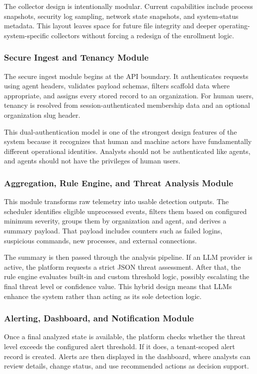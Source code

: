 \documentclass[12pt,a4paper]{article}
\begin{document}
The collector design is intentionally modular. Current capabilities include process snapshots, security log sampling, network state snapshots, and system-status metadata. This layout leaves space for future file integrity and deeper operating-system-specific collectors without forcing a redesign of the enrollment logic.

\subsubsection{Secure Ingest and Tenancy Module}
The secure ingest module begins at the API boundary. It authenticates requests using agent headers, validates payload schemas, filters scaffold data where appropriate, and assigns every stored record to an organization. For human users, tenancy is resolved from session-authenticated membership data and an optional organization slug header.

This dual-authentication model is one of the strongest design features of the system because it recognizes that human and machine actors have fundamentally different operational identities. Analysts should not be authenticated like agents, and agents should not have the privileges of human users.

\subsubsection{Aggregation, Rule Engine, and Threat Analysis Module}
This module transforms raw telemetry into usable detection outputs. The scheduler identifies eligible unprocessed events, filters them based on configured minimum severity, groups them by organization and agent, and derives a summary payload. That payload includes counters such as failed logins, suspicious commands, new processes, and external connections.

The summary is then passed through the analysis pipeline. If an LLM provider is active, the platform requests a strict JSON threat assessment. After that, the rule engine evaluates built-in and custom threshold logic, possibly escalating the final threat level or confidence value. This hybrid design means that LLMs enhance the system rather than acting as its sole detection logic.

\subsubsection{Alerting, Dashboard, and Notification Module}
Once a final analyzed state is available, the platform checks whether the threat level exceeds the configured alert threshold. If it does, a tenant-scoped alert record is created. Alerts are then displayed in the dashboard, where analysts can review details, change status, and use recommended actions as decision support.
\end{document}
